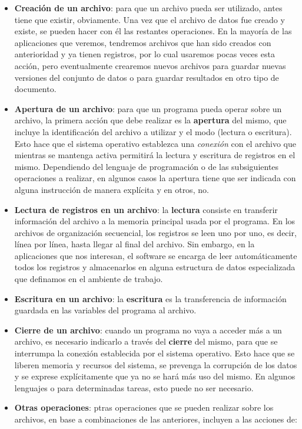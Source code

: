 \documentclass[
]{book}
\begin{document}
\begin{itemize}
\item
  \textbf{Creación de un archivo}: para que un archivo pueda ser utilizado, antes tiene que existir, obviamente. Una vez que el archivo de datos fue creado y existe, se pueden hacer con él las restantes operaciones. En la mayoría de las aplicaciones que veremos, tendremos archivos que han sido creados con anterioridad y ya tienen registros, por lo cual usaremos pocas veces esta acción, pero eventualmente crearemos nuevos archivos para guardar nuevas versiones del conjunto de datos o para guardar resultados en otro tipo de documento.
\item
  \textbf{Apertura de un archivo}: para que un programa pueda operar sobre un archivo, la primera acción que debe realizar es la \textbf{apertura} del mismo, que incluye la identificación del archivo a utilizar y el modo (lectura o escritura). Esto hace que el sistema operativo establezca una \emph{conexión} con el archivo que mientras se mantenga activa permitirá la lectura y escritura de registros en el mismo. Dependiendo del lenguaje de programación o de las subsiguientes operaciones a realizar, en algunos casos la apertura tiene que ser indicada con alguna instrucción de manera explícita y en otros, no.
\item
  \textbf{Lectura de registros en un archivo}: la \textbf{lectura} consiste en transferir información del archivo a la memoria principal usada por el programa. En los archivos de organización secuencial, los registros se leen uno por uno, es decir, línea por línea, hasta llegar al final del archivo. Sin embargo, en la aplicaciones que nos interesan, el software se encarga de leer automáticamente todos los registros y almacenarlos en alguna estructura de datos especializada que definamos en el ambiente de trabajo.
\item
  \textbf{Escritura en un archivo}: la \textbf{escritura} es la transferencia de información guardada en las variables del programa al archivo.
\item
  \textbf{Cierre de un archivo}: cuando un programa no vaya a acceder más a un archivo, es necesario indicarlo a través del \textbf{cierre} del mismo, para que se interrumpa la conexión establecida por el sistema operativo. Esto hace que se liberen memoria y recursos del sistema, se prevenga la corrupción de los datos y se exprese explícitamente que ya no se hará más uso del mismo. En algunos lenguajes o para determinadas tareas, esto puede no ser necesario.
\item
  \textbf{Otras operaciones}: ptras operaciones que se pueden realizar sobre los archivos, en base a combinaciones de las anteriores, incluyen a las acciones de:


\end{itemize}
\end{document}
